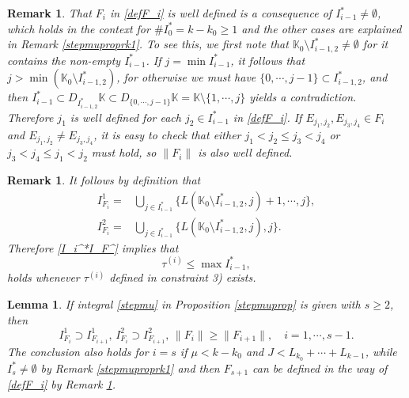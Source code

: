 \documentclass[11pt,reqno]{amsart}
\newtheorem{lemma}[theorem]{Lemma}
\newtheorem{remark}[theorem]{Remark}
\numberwithin{equation}{section}
\theoremstyle{definition}
\begin{document}
\begin{remark}\label{stepmuproprk2}
	That $F_i$ in \eqref{defF_i} is well defined is a consequence of $I_{i-1}^*\neq\emptyset$, which holds in the context for $\#I_0^*=k-k_0\geq1$ and the other cases are explained in Remark \ref{stepmuproprk1}. To see this, we first note that $\mathbb{K}_0\setminus I_{i-1,2}^*\neq\emptyset$ for it contains the non-empty $I_{i-1}^*$. If $j=\min I_{i-1}^*$, it follows that $j>\min(\mathbb{K}_0\setminus I_{i-1,2}^*)$, for otherwise we must have $\{0,\cdots,j-1\}\subset I_{i-1,2}^*$, and then $I_{i-1}^*\subset D_{I_{i-1,2}^*}\mathbb{K}\subset D_{\{0,\cdots,j-1\}}\mathbb{K}=\mathbb{K}\setminus\{1,\cdots,j\}$ yields a contradiction. Therefore $j_1$ is well defined for each $j_2\in I_{i-1}^*$ in \eqref{defF_i}. If $E_{j_1,j_2},E_{j_3,j_4}\in F_i$ and $E_{j_1,j_2}\neq E_{j_3,j_4}$, it is easy to check that either $j_1<j_2\leq j_3<j_4$ or $j_3<j_4\leq j_1<j_2$ must hold, so $\|F_i\|$ is also well defined.
\end{remark}

\begin{remark}
	It follows by definition that
	\begin{equation}\label{defI_F12'}
		\begin{split}
			I_{F_i}^1=&\bigcup_{j\in I_{i-1}^*}\{L(\mathbb{K}_0\setminus I_{i-1,2}^*,j)+1,\cdots,j\},\\
			I_{F_i}^2=&\bigcup_{j\in I_{i-1}^*}\{L(\mathbb{K}_0\setminus I_{i-1,2}^*,j),j\}.
		\end{split}
	\end{equation}
	Therefore \eqref{I_i^*I_F^} implies that
	\begin{equation}\label{stepmuconstraint3}
		\tau^{(i)}\leq\max I_{i-1}^*,
	\end{equation}
	holds whenever $\tau^{(i)}$ defined in constraint 3) exists.
\end{remark}

\begin{lemma}\label{lmIF}
	If integral \eqref{stepmu} in Proposition \ref{stepmuprop} is given with $s\geq2$, then
	\begin{equation}
		I_{F_i}^1\supset I_{F_{i+1}}^1,\,I_{F_i}^2\supset I_{F_{i+1}}^2,\,\|F_i\|\geq\|F_{i+1}\|,\quad i=1,\cdots,s-1.
	\end{equation}
	The conclusion also holds for $i=s$ if $\mu<k-k_0$ and $J<L_{k_0}+\cdots+L_{k-1}$, while $I_s^*\neq\emptyset$ by Remark \ref{stepmuproprk1} and then $F_{s+1}$ can be defined in the way of \eqref{defF_i} by Remark \ref{stepmuproprk2}.
\end{lemma}
\end{document}

